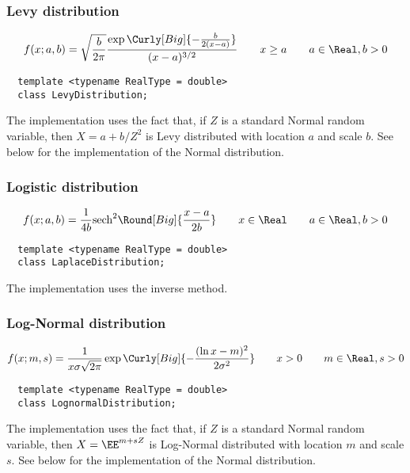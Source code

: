 \subsubsection{Levy distribution}

\begin{equation*}
  f(x;a,b) = \sqrt{\frac{b}{2\pi}}
  \frac{\exp\Curly[Big]{-\frac{b}{2(x - a)}}}{(x - a)^{3/2}}
  \qquad x \ge a
  \qquad a \in \Real, b > 0
\end{equation*}
\begin{Verbatim}
  template <typename RealType = double>
  class LevyDistribution;
\end{Verbatim}
The implementation uses the fact that, if $Z$ is a standard Normal random
variable, then $X = a + b / Z^2$ is Levy distributed with location $a$ and
scale $b$. See below for the implementation of the Normal distribution.

\subsubsection{Logistic distribution}

\begin{equation*}
  f(x;a,b) = \frac{1}{4b}\mathrm{sech}^2\Round[Big]{\frac{x - a}{2b}}
  \qquad x \in \Real
  \qquad a \in \Real, b > 0
\end{equation*}
\begin{Verbatim}
  template <typename RealType = double>
  class LaplaceDistribution;
\end{Verbatim}
The implementation uses the inverse method.

\subsubsection{Log-Normal distribution}

\begin{equation*}
  f(x;m,s) = \frac{1}{x\sigma\sqrt{2\pi}}\exp\Curly[Big]{
    -\frac{(\ln x - m)^2}{2\sigma^2}}
  \qquad x > 0
  \qquad m \in \Real, s > 0
\end{equation*}
\begin{Verbatim}
  template <typename RealType = double>
  class LognormalDistribution;
\end{Verbatim}
The implementation uses the fact that, if $Z$ is a standard Normal random
variable, then $X = \EE^{m + sZ}$ is Log-Normal distributed with location $m$
and scale $s$. See below for the implementation of the Normal distribution.

